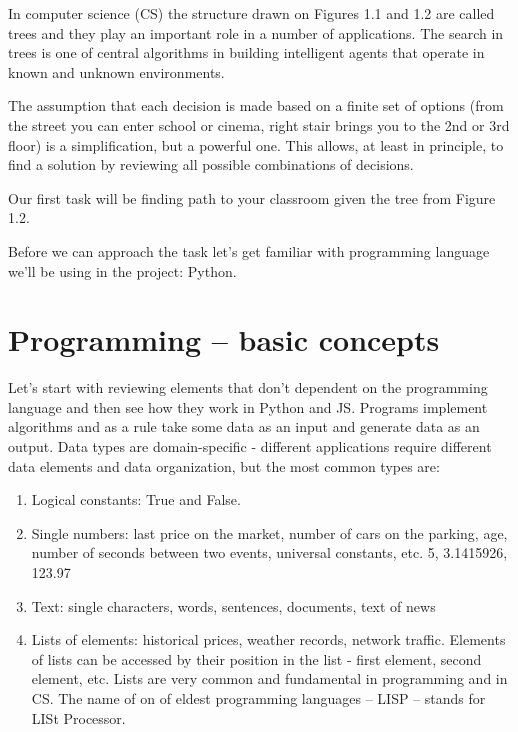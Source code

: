 In computer science (CS) the structure drawn on Figures 1.1 and 1.2
are called trees and
they play an important role in a number of applications.
The search in trees is one of central algorithms in building
intelligent agents that operate in known and unknown environments.

The assumption that each decision is made based
on a finite set of options (from the street you can enter school or cinema,
right stair brings you to the 2nd or 3rd floor) is a simplification,
but a powerful one. This allows,
at least in principle, to find a solution by reviewing all possible
combinations of decisions.

Our first task will be finding path to your classroom
given the tree from Figure 1.2.

Before we can approach the task let's get familiar with
programming language we'll be using in the project: Python.

\section{Programming -- basic concepts}

Let's start with reviewing elements that don't dependent
on the programming language and then see how they work in
Python and JS. Programs implement algorithms and
as a rule take some data as an input and generate data as an output.
Data types are domain-specific - different applications require
different data elements and
data organization, but the most common types are:

\begin{leftborder}
\begin{enumerate}
\item Logical constants: True and False.
\item Single numbers: last price on the market, number of
cars on the parking, age, number of seconds between two events,
universal constants, etc. 5, 3.1415926, 123.97
\item Text: single characters, words, sentences, documents, text of news
\item Lists of elements: historical prices, weather records,
network traffic. Elements of lists can be accessed by their
position in the list - first element, second element, etc.
Lists are very common and fundamental in programming and in CS.
The name of on of eldest programming languages -- LISP --
stands for LISt Processor.
\end{enumerate}
\end{leftborder}

